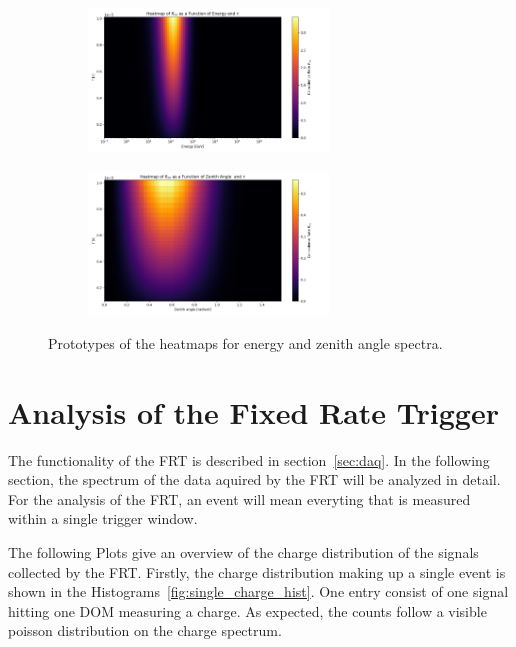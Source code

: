 \begin{figure}[ht]
    \centering
    \begin{subfigure}[b]{\textwidth}
        \centering
        \includegraphics[width=0.7\textwidth]{Plots/heatmap_energy.png}
    \end{subfigure}
    \vspace{1em} %
    \begin{subfigure}[b]{\textwidth}
        \centering
        \includegraphics[width=0.7\textwidth]{Plots/heatmap_zenith.png}
    \end{subfigure}
    \caption{Prototypes of the heatmaps for energy and zenith angle spectra.}
    \label{fig:heatmaps_combined}
\end{figure}



\section{Analysis of the Fixed Rate Trigger}

The functionality of the FRT is described in section~\ref{sec:daq}. In the following section, the spectrum of the data aquired by the FRT will be analyzed in 
detail. For the analysis of the FRT, an event will mean everyting that is measured within a single trigger window. 

The following Plots give an overview of the charge distribution of the signals collected by the FRT. Firstly, the charge distribution making up a 
single event is shown in the Histograms~\ref{fig:single_charge_hist}. One entry consist of one signal hitting one DOM measuring a charge.
As expected, the counts follow a visible poisson distribution on the charge spectrum. 

